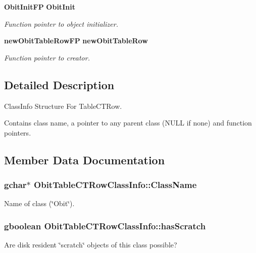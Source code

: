 \begin{CompactItemize}
{\bf Obit\-Init\-FP} {\bf Obit\-Init}
\begin{CompactList}\small\item\em Function pointer to object initializer. \item\end{CompactList}\item 
{\bf new\-Obit\-Table\-Row\-FP} {\bf new\-Obit\-Table\-Row}
\begin{CompactList}\small\item\em Function pointer to creator. \item\end{CompactList}\end{CompactItemize}


\subsection{Detailed Description}
Class\-Info Structure For Table\-CTRow. 

Contains class name, a pointer to any parent class (NULL if none) and function pointers. 



\subsection{Member Data Documentation}
\subsubsection{\setlength{\rightskip}{0pt plus 5cm}gchar$\ast$ {\bf Obit\-Table\-CTRow\-Class\-Info::Class\-Name}}\label{structObitTableCTRowClassInfo_o2}


Name of class (\char`\"{}Obit\char`\"{}). 

\subsubsection{\setlength{\rightskip}{0pt plus 5cm}gboolean {\bf Obit\-Table\-CTRow\-Class\-Info::has\-Scratch}}\label{structObitTableCTRowClassInfo_o1}


Are disk resident \char`\"{}scratch\char`\"{} objects of this class possible? 

